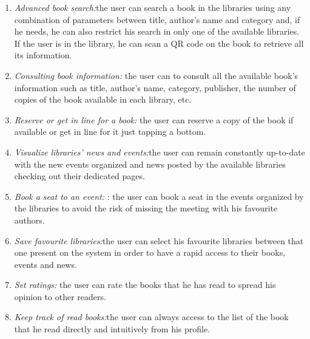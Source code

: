 \begin{enumerate}
\item \emph{Advanced book search:}the user can search a book in the libraries using any combination of parameters between title, author’s name and category and, if he needs, he can also restrict his search in only one of the available libraries. If the user is in the library, he can scan a QR code on the book to retrieve all its information.
\item \emph{Consulting book information:} the user can to consult all the available book’s information such as title, author’s name, category, publisher, the number of copies of the book available in each library, etc.
\item \emph{Reserve or get in line for a book:} the user can reserve a copy of the book if available or get in line for it just tapping a bottom.
\item \emph{Visualize libraries’ news and events:}the user can remain constantly up-to-date with the new events organized and news posted by the available libraries checking out their dedicated pages. 
\item \emph{Book a seat to an event:} : the user can book a seat in the events organized by the libraries to avoid the risk of missing the meeting with his favourite authors.
\item \emph{Save favourite libraries:}the user can select his favourite libraries between that one present on the system in order to have a rapid access to their books, events and news. 
\item \emph{Set ratings:} the user can rate the books that he has read to spread his opinion to other readers.
\item \emph{Keep track of read books:}the user can always access to the list of the book that he read directly and intuitively from his profile.
\end{enumerate}

